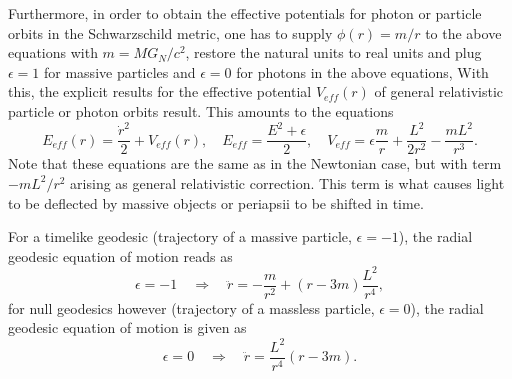 \documentclass[a4paper,11pt]{article}
\numberwithin{equation}{section}
\begin{document}
{Furthermore, in order to obtain the effective potentials for photon or particle orbits in the Schwarzschild metric, one has to supply $\phi(r) = m/r$ to the above equations with $m = MG_N/c^2$, restore the natural units to real units and plug $\epsilon = 1$ for massive particles and $\epsilon=0$ for photons in the above equations, With this, the explicit results for the effective potential $V_{eff}(r)$ of general relativistic particle or photon orbits result. This amounts to the equations \begin{equation}
E_{eff}(r) = \frac{\dot{r}^2}{2}+ V_{eff}(r), \quad E_{eff} = \frac{E^2+\epsilon}{2}, \quad V_{eff} = \epsilon\frac{m}{r} + \frac{L^2}{2r^2} - \frac{mL^2}{r^3}.
\end{equation} Note that these equations are the same as in the Newtonian case, but with term $-mL^2/r^2$ arising as general relativistic correction. This term is what causes light to be deflected by massive objects or periapsii to be shifted in time.

For a timelike geodesic (trajectory of a massive particle, $\epsilon= -1$), the radial geodesic equation of motion reads as \begin{equation}
\epsilon = -1 \quad \Rightarrow \quad \ddot{r} = -\frac{m}{r^2} + (r-3m)\frac{L^2}{r^4},
\end{equation} for null geodesics however (trajectory of a massless particle, $\epsilon = 0$), the radial geodesic equation of motion is given as \begin{equation}
\epsilon = 0 \quad \Rightarrow \quad \ddot{r} = \frac{L^2}{r^4}(r-3m).
\end{equation}
}
\end{document}
